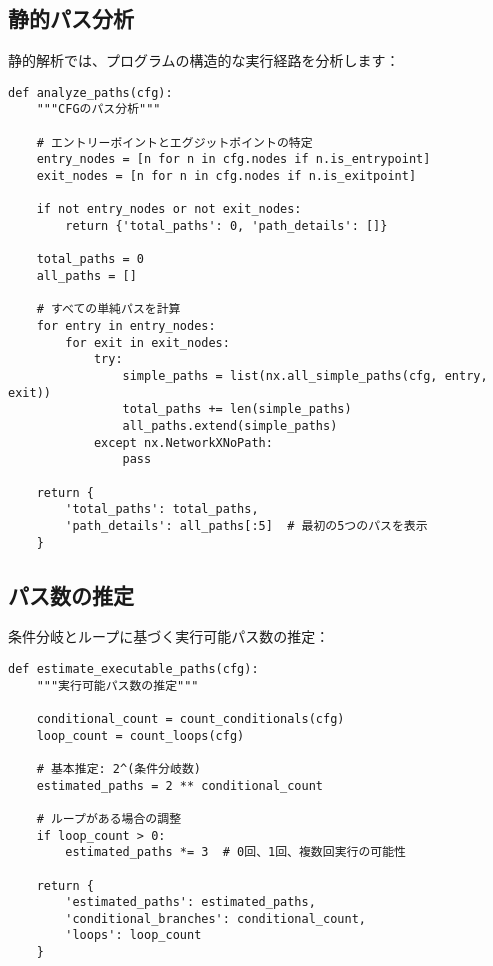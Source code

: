 \documentclass[12pt,a4paper]{article}
\begin{document}
\subsection{静的パス分析}

静的解析では、プログラムの構造的な実行経路を分析します：

\begin{lstlisting}[caption=パス分析の実装]
def analyze_paths(cfg):
    """CFGのパス分析"""

    # エントリーポイントとエグジットポイントの特定
    entry_nodes = [n for n in cfg.nodes if n.is_entrypoint]
    exit_nodes = [n for n in cfg.nodes if n.is_exitpoint]

    if not entry_nodes or not exit_nodes:
        return {'total_paths': 0, 'path_details': []}

    total_paths = 0
    all_paths = []

    # すべての単純パスを計算
    for entry in entry_nodes:
        for exit in exit_nodes:
            try:
                simple_paths = list(nx.all_simple_paths(cfg, entry, exit))
                total_paths += len(simple_paths)
                all_paths.extend(simple_paths)
            except nx.NetworkXNoPath:
                pass

    return {
        'total_paths': total_paths,
        'path_details': all_paths[:5]  # 最初の5つのパスを表示
    }
\end{lstlisting}

\subsection{パス数の推定}

条件分岐とループに基づく実行可能パス数の推定：

\begin{lstlisting}[caption=実行可能パス数の推定]
def estimate_executable_paths(cfg):
    """実行可能パス数の推定"""

    conditional_count = count_conditionals(cfg)
    loop_count = count_loops(cfg)

    # 基本推定: 2^(条件分岐数)
    estimated_paths = 2 ** conditional_count

    # ループがある場合の調整
    if loop_count > 0:
        estimated_paths *= 3  # 0回、1回、複数回実行の可能性

    return {
        'estimated_paths': estimated_paths,
        'conditional_branches': conditional_count,
        'loops': loop_count
    }
\end{lstlisting}
\end{document}
